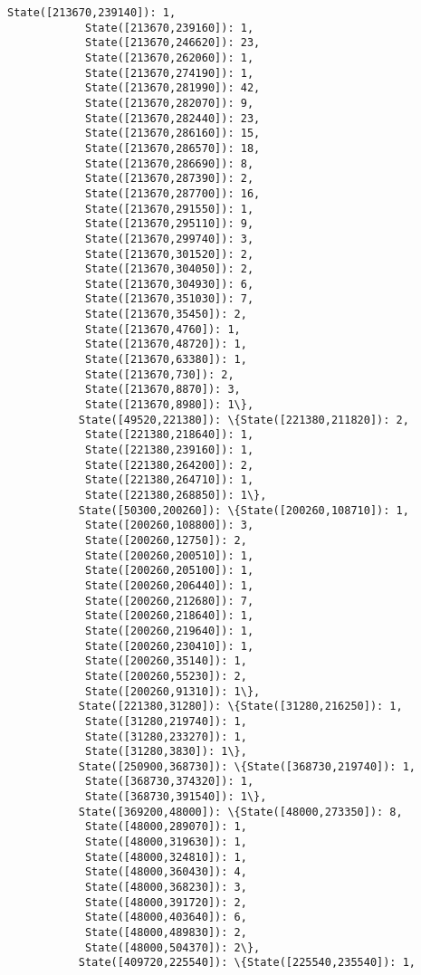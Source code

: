 \documentclass[11pt]{article}
\begin{document}
\begin{Verbatim}[commandchars=\\\{\}]
            State([213670,239140]): 1,
            State([213670,239160]): 1,
            State([213670,246620]): 23,
            State([213670,262060]): 1,
            State([213670,274190]): 1,
            State([213670,281990]): 42,
            State([213670,282070]): 9,
            State([213670,282440]): 23,
            State([213670,286160]): 15,
            State([213670,286570]): 18,
            State([213670,286690]): 8,
            State([213670,287390]): 2,
            State([213670,287700]): 16,
            State([213670,291550]): 1,
            State([213670,295110]): 9,
            State([213670,299740]): 3,
            State([213670,301520]): 2,
            State([213670,304050]): 2,
            State([213670,304930]): 6,
            State([213670,351030]): 7,
            State([213670,35450]): 2,
            State([213670,4760]): 1,
            State([213670,48720]): 1,
            State([213670,63380]): 1,
            State([213670,730]): 2,
            State([213670,8870]): 3,
            State([213670,8980]): 1\},
           State([49520,221380]): \{State([221380,211820]): 2,
            State([221380,218640]): 1,
            State([221380,239160]): 1,
            State([221380,264200]): 2,
            State([221380,264710]): 1,
            State([221380,268850]): 1\},
           State([50300,200260]): \{State([200260,108710]): 1,
            State([200260,108800]): 3,
            State([200260,12750]): 2,
            State([200260,200510]): 1,
            State([200260,205100]): 1,
            State([200260,206440]): 1,
            State([200260,212680]): 7,
            State([200260,218640]): 1,
            State([200260,219640]): 1,
            State([200260,230410]): 1,
            State([200260,35140]): 1,
            State([200260,55230]): 2,
            State([200260,91310]): 1\},
           State([221380,31280]): \{State([31280,216250]): 1,
            State([31280,219740]): 1,
            State([31280,233270]): 1,
            State([31280,3830]): 1\},
           State([250900,368730]): \{State([368730,219740]): 1,
            State([368730,374320]): 1,
            State([368730,391540]): 1\},
           State([369200,48000]): \{State([48000,273350]): 8,
            State([48000,289070]): 1,
            State([48000,319630]): 1,
            State([48000,324810]): 1,
            State([48000,360430]): 4,
            State([48000,368230]): 3,
            State([48000,391720]): 2,
            State([48000,403640]): 6,
            State([48000,489830]): 2,
            State([48000,504370]): 2\},
           State([409720,225540]): \{State([225540,235540]): 1,

\end{Verbatim}
\end{document}
